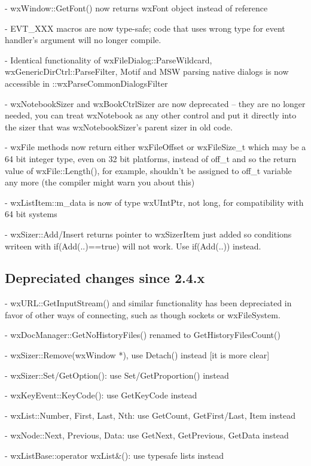 - wxWindow::GetFont() now returns wxFont object instead of reference

- EVT\_XXX macros are now type-safe; code that uses wrong type for event
  handler's argument will no longer compile.

- Identical functionality of wxFileDialog::ParseWildcard,
  wxGenericDirCtrl::ParseFilter, Motif and MSW parsing native dialogs
  is now accessible in ::wxParseCommonDialogsFilter

- wxNotebookSizer and wxBookCtrlSizer are now deprecated -- they are no longer
  needed, you can treat wxNotebook as any other control and put it directly
  into the sizer that was wxNotebookSizer's parent sizer in old code.

- wxFile methods now return either wxFileOffset or wxFileSize\_t which may be a
  64 bit integer type, even on 32 bit platforms, instead of off\_t and so the
  return value of wxFile::Length(), for example, shouldn't be assigned to off\_t
  variable any more (the compiler might warn you about this)

- wxListItem::m\_data is now of type wxUIntPtr, not long, for compatibility
  with 64 bit systems

- wxSizer::Add/Insert returns pointer to wxSizerItem just added so conditions
  writeen with if(Add(..)==true) will not work. Use if(Add(..)) instead.

\subsection{Depreciated changes since 2.4.x}

- wxURL::GetInputStream() and similar functionality has been depreciated in
  favor of other ways of connecting, such as though sockets or wxFileSystem.

- wxDocManager::GetNoHistoryFiles() renamed to GetHistoryFilesCount()

- wxSizer::Remove(wxWindow *), use Detach() instead [it is more clear]

- wxSizer::Set/GetOption(): use Set/GetProportion() instead

- wxKeyEvent::KeyCode(): use GetKeyCode instead

- wxList::Number, First, Last, Nth: use GetCount, GetFirst/Last, Item instead

- wxNode::Next, Previous, Data: use GetNext, GetPrevious, GetData instead

- wxListBase::operator wxList&(): use typesafe lists instead

